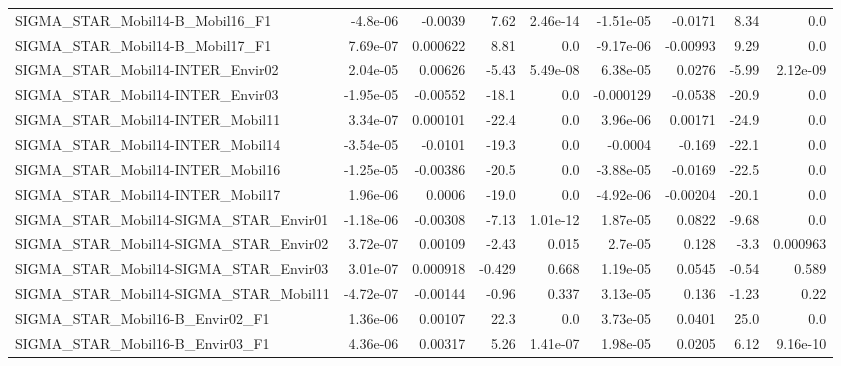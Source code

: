\begin{tabular}{lrrrrrrrr}
SIGMA\_STAR\_Mobil14-B\_Mobil16\_F1           &    -4.8e-06 &      -0.0039 &    7.62 & 2.46e-14 &  -1.51e-05 &     -0.0171 &         8.34 &           0.0 \\
SIGMA\_STAR\_Mobil14-B\_Mobil17\_F1           &    7.69e-07 &     0.000622 &    8.81 &      0.0 &  -9.17e-06 &    -0.00993 &         9.29 &           0.0 \\
SIGMA\_STAR\_Mobil14-INTER\_Envir02          &    2.04e-05 &      0.00626 &   -5.43 & 5.49e-08 &   6.38e-05 &      0.0276 &        -5.99 &      2.12e-09 \\
SIGMA\_STAR\_Mobil14-INTER\_Envir03          &   -1.95e-05 &     -0.00552 &   -18.1 &      0.0 &  -0.000129 &     -0.0538 &        -20.9 &           0.0 \\
SIGMA\_STAR\_Mobil14-INTER\_Mobil11          &    3.34e-07 &     0.000101 &   -22.4 &      0.0 &   3.96e-06 &     0.00171 &        -24.9 &           0.0 \\
SIGMA\_STAR\_Mobil14-INTER\_Mobil14          &   -3.54e-05 &      -0.0101 &   -19.3 &      0.0 &    -0.0004 &      -0.169 &        -22.1 &           0.0 \\
SIGMA\_STAR\_Mobil14-INTER\_Mobil16          &   -1.25e-05 &     -0.00386 &   -20.5 &      0.0 &  -3.88e-05 &     -0.0169 &        -22.5 &           0.0 \\
SIGMA\_STAR\_Mobil14-INTER\_Mobil17          &    1.96e-06 &       0.0006 &   -19.0 &      0.0 &  -4.92e-06 &    -0.00204 &        -20.1 &           0.0 \\
SIGMA\_STAR\_Mobil14-SIGMA\_STAR\_Envir01     &   -1.18e-06 &     -0.00308 &   -7.13 & 1.01e-12 &   1.87e-05 &      0.0822 &        -9.68 &           0.0 \\
SIGMA\_STAR\_Mobil14-SIGMA\_STAR\_Envir02     &    3.72e-07 &      0.00109 &   -2.43 &    0.015 &    2.7e-05 &       0.128 &         -3.3 &      0.000963 \\
SIGMA\_STAR\_Mobil14-SIGMA\_STAR\_Envir03     &    3.01e-07 &     0.000918 &  -0.429 &    0.668 &   1.19e-05 &      0.0545 &        -0.54 &         0.589 \\
SIGMA\_STAR\_Mobil14-SIGMA\_STAR\_Mobil11     &   -4.72e-07 &     -0.00144 &   -0.96 &    0.337 &   3.13e-05 &       0.136 &        -1.23 &          0.22 \\
SIGMA\_STAR\_Mobil16-B\_Envir02\_F1           &    1.36e-06 &      0.00107 &    22.3 &      0.0 &   3.73e-05 &      0.0401 &         25.0 &           0.0 \\
SIGMA\_STAR\_Mobil16-B\_Envir03\_F1           &    4.36e-06 &      0.00317 &    5.26 & 1.41e-07 &   1.98e-05 &      0.0205 &         6.12 &      9.16e-10 \\

\end{tabular}
